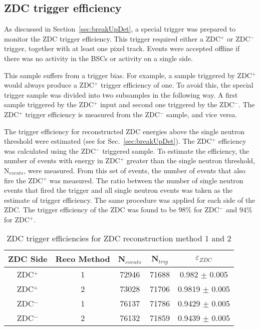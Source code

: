     \subsection{ZDC trigger efficiency}
      As discussed in Section~\ref{sec:breakUpDet}, a special trigger was 
        prepared to monitor the ZDC trigger efficiency. 
      This trigger required either a ZDC$^{+}$ or ZDC$^{-}$ trigger, together with at 
        least one pixel track. 
      Events were accepted offline if there was no activity in the BSCs or 
        activity on a single side. 

      This sample suffers from a trigger bias. 
      For example, a sample triggered by ZDC$^{+}$ would always produce a ZDC$^{+}$ 
        trigger efficiency of one. 
      To avoid this, the special trigger sample was divided into two 
        subsamples in the following way. 
      A first sample triggered by the ZDC$^{+}$ input and second one triggered by 
        the ZDC$^{-}$. 
      The ZDC$^{+}$ trigger efficiency is measured from the ZDC$^{-}$ sample, and vice 
        versa.

      The trigger efficiency for reconstructed ZDC energies above the
        single neutron threshold were estimated (see for Sec.~\ref{sec:breakUpDet}).
      The ZDC$^{+}$ efficiency was calculated using the ZDC$^{-}$ triggered 
        sample.
      To estimate the efficiency, the number of events with energy in 
        ZDC$^{+}$ greater than the single neutron threshold, N$_{events}$, 
        were measured.
      From this set of events, the number of events that also fire the 
        ZDC$^{+}$ was measured.
      The ratio between the number of single neutron events that fired the 
        trigger and all single neutron events was taken as the estimate of 
        trigger efficiency. 
      The same procedure was applied for each side of the ZDC.
      The trigger efficiency of the ZDC was found to be 98\% for ZDC$^{-}$
        and 94\% for ZDC$^{+}$.

      \begin{table}
        \centering
        \begin{tabular}{|c|c|c|c|c|}
           ZDC Side & Reco Method & N$_{events}$ & N$_{trig}$ & $\varepsilon_{ZDC}$ \\ \hline
           ZDC$^{+}$ & 1 & 72946  & 71688 & 0.982 $\pm$ 0.005 \\ \hline
           ZDC$^{+}$ & 2 & 73028  & 71706  & 0.9819  $\pm$ 0.005  \\ \hline
           ZDC$^{-}$ & 1 & 76137  & 71786  & 0.9429  $\pm$ 0.005  \\ \hline
           ZDC$^{-}$ & 2 & 76132  & 71859  & 0.9439  $\pm$ 0.005  \\ \hline
        \end{tabular}
        \caption{ZDC trigger efficiencies for ZDC reconstruction method 1 and 
          2}
        \label{tab:zdcEfficiency}
      \end{table}

